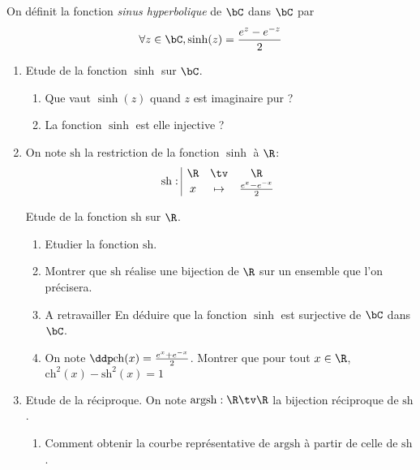 




\begin{exercice}
On définit la fonction \emph{sinus hyperbolique} de  $\bC$ dans $\bC$ par  
$$\forall z\in \bC, \sinh(z) =\frac{e^z -e^{-z}}{2}$$


\begin{enumerate}
\item Etude de la fonction $\sinh$ sur $\bC$.
\begin{enumerate}
\item Que vaut $\sinh(z)$ quand $z$ est imaginaire pur ? 
\item La fonction $\sinh$ est elle injective ? 
\end{enumerate}

\item  On note $\mathrm{sh}$ la restriction de la fonction $\sinh$ à $\R$:
$$\mathrm{sh} :  \begin{array}{|ccc}
\R &\tv& \R\\
x &\mapsto & \frac{e^x -e^{-x}}{2}
\end{array}$$ 

Etude de la fonction $\mathrm{sh}$ sur $\R$. 
\begin{enumerate}
\item Etudier la fonction $\mathrm{sh}$. 
\item Montrer que $\mathrm{sh}$ réalise une bijection de $\R$ sur un ensemble que l'on précisera.
\item \warning A retravailler \warning En déduire que la fonction $\sinh$ est surjective  de $\bC$ dans $\bC$.  
\item On note $\ddp \mathrm{ch}(x)  =\frac{e^x +e^{-x}}{2}$. Montrer que pour tout $x\in \R$, $\mathrm{ch}^2(x)-\mathrm{sh}^2(x)=1$
\end{enumerate}
\item Etude de la réciproque. 
On note $\mathrm{argsh} : \R \tv \R$ la bijection réciproque de $\mathrm{sh}$. 
\begin{enumerate}
\item  Comment  obtenir la courbe représentative de $\mathrm{argsh} $ à partir de celle de $\mathrm{sh}$. 


\end{enumerate}
\end{enumerate}
\end{exercice}
